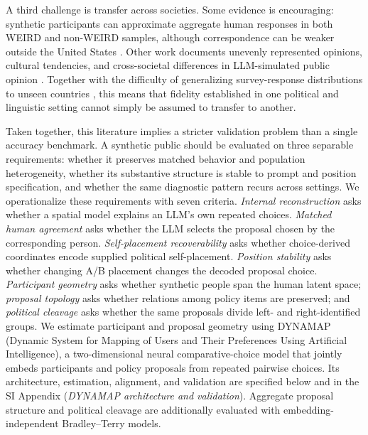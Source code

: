 \documentclass[unnumsec,webpdf,modern,large]{oup-authoring-template}
\begin{document}
A third challenge is transfer across societies. Some evidence is encouraging: synthetic participants can approximate aggregate human responses in both WEIRD and non-WEIRD samples, although correspondence can be weaker outside the United States \citep{Shrestha2024}. Other work documents unevenly represented opinions, cultural tendencies, and cross-societal differences in LLM-simulated public opinion \citep{Santurkar2023,Atari2023,Brinkmann2023,Lu2025,Abeliuk2026}. Together with the difficulty of generalizing survey-response distributions to unseen countries \citep{Cao2025}, this means that fidelity established in one political and linguistic setting cannot simply be assumed to transfer to another.

Taken together, this literature implies a stricter validation problem than a single accuracy benchmark. A synthetic public should be evaluated on three separable requirements: whether it preserves matched behavior and population heterogeneity, whether its substantive structure is stable to prompt and position specification, and whether the same diagnostic pattern recurs across settings. We operationalize these requirements with seven criteria. \emph{Internal reconstruction} asks whether a spatial model explains an LLM's own repeated choices. \emph{Matched human agreement} asks whether the LLM selects the proposal chosen by the corresponding person. \emph{Self-placement recoverability} asks whether choice-derived coordinates encode supplied political self-placement. \emph{Position stability} asks whether changing A/B placement changes the decoded proposal choice. \emph{Participant geometry} asks whether synthetic people span the human latent space; \emph{proposal topology} asks whether relations among policy items are preserved; and \emph{political cleavage} asks whether the same proposals divide left- and right-identified groups. We estimate participant and proposal geometry using DYNAMAP (Dynamic System for Mapping of Users and Their Preferences Using Artificial Intelligence), a two-dimensional neural comparative-choice model that jointly embeds participants and policy proposals from repeated pairwise choices. Its architecture, estimation, alignment, and validation are specified below and in the SI Appendix (\textit{DYNAMAP architecture and validation}). Aggregate proposal structure and political cleavage are additionally evaluated with embedding-independent Bradley--Terry models.
\end{document}

